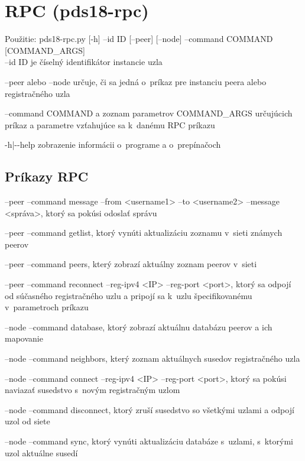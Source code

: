 \section{RPC (pds18-rpc)}

\begin{framed}
	Použitie: pds18-rpc.py [-h] --id ID [--peer] [--node] --command COMMAND [COMMAND\_ARGS]
	\\
	
	--id ID je číselný identifikátor instancie uzla
	
	--peer alebo --node určuje, či sa jedná o~príkaz pre instanciu peera alebo registračného uzla
	
	--command COMMAND a zoznam parametrov COMMAND\_ARGS určujúcich príkaz a parametre vzťahujúce sa k~danému RPC príkazu
	
	-h|-{}-help zobrazenie informácii o~programe a o~prepínačoch
\end{framed}

\subsection{Príkazy RPC}

\begin{framed}
--peer --command message --from <username1> --to <username2> --message <správa>, ktorý sa pokúsi odoslať správu

--peer --command getlist, ktorý vynúti aktualizáciu zoznamu v~sieti známych peerov

--peer --command peers, který zobrazí aktuálny zoznam peerov v~sieti

--peer --command reconnect --reg-ipv4 <IP> --reg-port <port>, ktorý sa odpojí od súčasného registračného uzlu a pripojí sa k~uzlu špecifikovanému v~parametroch príkazu

--node --command database, ktorý zobrazí aktuálnu databázu peerov a ich mapovanie

--node --command neighbors, který zoznam aktuálnych susedov registračného uzla

--node --command connect --reg-ipv4 <IP> --reg-port <port>, ktorý sa pokúsi naviazať susedstvo s~novým registračným uzlom

--node --command disconnect, ktorý zruší susedstvo so všetkými uzlami a odpojí uzol od siete

--node --command sync, ktorý vynúti aktualizáciu databáze s~uzlami, s~ktorými uzol aktuálne susedí
\end{framed}


